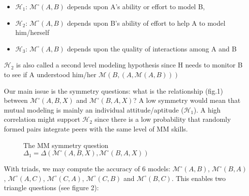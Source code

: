 \documentclass{report}
\begin{document}
\begin{itemize}
    \item $\mathcal{H}_{1}$: $\mathcal{M}^{\circ}(A,B)$ depends upon A’s ability or effort
        to model B,
    
    \item $\mathcal{H}_{2}$: $\mathcal{M}^{\circ}(A,B)$ depends upon  B’s ability of
        effort to help A to model him/herself 

    \item $\mathcal{H}_{3}$: $\mathcal{M}^{\circ}(A,B)$ depends upon the quality of
        interactions among A and B

\end{itemize}



$\mathcal{H}_{2}$ is also called a second level modeling hypothesis since H
needs to monitor B to see if A understood him/her
$\mathcal{M}(B,(A,\mathcal{M}(A,B)))$

Our main issue is the symmetry questions: what is the relationship (fig.1)
between $\mathcal{M}^{\circ}(A,B,X)$ and $\mathcal{M}^{\circ}(B,A,X)$? A low
symmetry would mean that mutual modeling
is mainly an individual attitude/aptitude ($\mathcal{H}_{1}$). A high
correlation might support $\mathcal{H}_{2}$ since there is a low probability
that randomly formed pairs integrate peers with the same level of MM skills.

\begin{figure*}[htb]
\centering


\caption{The MM symmetry question $\Delta_1 =  \Delta(\mathcal{M}^{\circ} (A,B,X),
\mathcal{M}^{\circ} (B,A,X))$}

\label{mm_symetry}
\end{figure*}


With triads, we may compute the accuracy of 6 models:
$\mathcal{M}^{\circ}(A,B)$, $\mathcal{M}^{\circ}(B,A)$,
$\mathcal{M}^{\circ}(A,C)$, $\mathcal{M}^{\circ}(C,A)$,
$\mathcal{M}^{\circ}(C,B)$ and $\mathcal{M}^{\circ}(B,C)$. This enables two
triangle questions (see figure 2):
\end{document}
